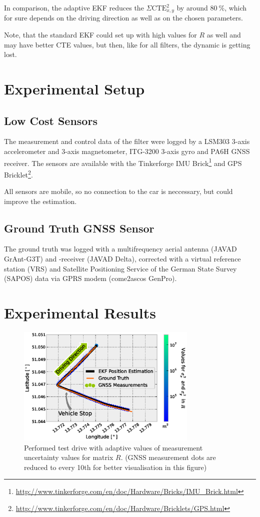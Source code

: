 \documentclass[conference]{IEEEtran}
\begin{document}
In comparison, the adaptive EKF reduces the $\Sigma \text{CTE}_{x,y}^2$ by around $\SI{80}{\percent}$, which for sure depends on the driving direction as well as on the chosen parameters.

Note, that the standard EKF could set up with high values for $R$ as well and may have better CTE values, but then, like for all filters, the dynamic is getting lost.

\section{Experimental Setup}

\subsection{Low Cost Sensors}

The measurement and control data of the filter were logged by a LSM303 3-axis accelerometer and 3-axis magnetometer, ITG-3200 3-axis gyro and PA6H GNSS receiver. The sensors are available with the Tinkerforge IMU Brick\footnote{\url{http://www.tinkerforge.com/en/doc/Hardware/Bricks/IMU_Brick.html}} and GPS Bricklet\footnote{\url{http://www.tinkerforge.com/en/doc/Hardware/Bricklets/GPS.html}}.

All sensors are mobile, so no connection to the car is neccessary, but could improve the estimation.

\subsection{Ground Truth GNSS Sensor}

The ground truth was logged with a multifrequency aerial antenna (JAVAD GrAnt-G3T) and -receiver (JAVAD Delta), corrected with a virtual reference station (VRS) and Satellite Positioning Service of the German State Survey (SAPOS) data via GPRS modem (come2ascos GenPro).

\section{Experimental Results}



\begin{figure}[h!]
\centering
\includegraphics[width=3.4in]{images/Extended-Kalman-Filter-CTRV-Position}
\caption{Performed test drive with adaptive values of measurement uncertainty values for matrix $R$. (GNSS measurement dots are reduced to every 10th for better visualisation in this figure)}
\label{ctrv-position}
\end{figure}
\end{document}
